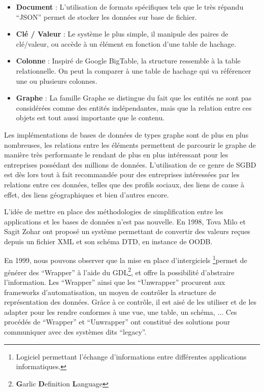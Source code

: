 \documentclass[a4paper,fleqn,12pt,oneside]{report}
\begin{document}
\begin{itemize}
\item \textbf{Document} : L'utilisation de formats spécifiques tels que le très répandu \enquote{JSON} permet de stocker les données sur base de fichier.
\item \textbf{Clé / Valeur }: Le système le plus simple, il manipule des paires de clé/valeur, ou accède à un élément en fonction d'une table de hachage.
\item \textbf{Colonne} : Inspiré de Google BigTable, la structure ressemble à la table relationnelle. On peut la comparer à une table de hachage qui va référencer une ou plusieurs colonnes.
\item \textbf{Graphe} : La famille Graphe se distingue du fait que les entités ne sont pas considérées comme des entités indépendantes, mais que la relation entre ces objets est tout aussi importante que le contenu.
\end{itemize} 

Les implémentations de bases de données de types graphe sont de plus en plus nombreuses, les relations entre les éléments permettent de parcourir le graphe de manière très performante \cite{vicknair2010comparison} le rendant de plus en plus intéressant pour les entreprises possédant des millions de données. L'utilisation de ce genre de SGBD est dès lors tout à fait recommandée pour des entreprises intéressées par les relations entre ces données, telles que des profils sociaux, des liens de cause à effet, des liens géographiques et bien d’autres encore.\cite{infoqSite}\cite{NoSqlDef}\cite{bruchez2016bases}

L'idée de mettre en place des méthodologies de simplification entre les applications et les bases de données n'est pas nouvelle. En 1998, Tova Milo et Sagit Zohar ont proposé un système permettant de convertir des valeurs reçues depuis un fichier XML et son schéma DTD, en instance de OODB\cite{milo1998using}. 

\label{frameworksAnalyse}
En 1999, nous pouvons observer que la mise en place d'intergiciels \footnote{Logiciel permettant l'échange d'informations entre différentes applications informatiques. }permet de générer des \enquote{Wrapper} à l'aide du GDL\footnote{\textbf{G}arlic \textbf{D}efinition \textbf{L}anguage}, et offre la possibilité d'abstraire l'information\cite{niswonger1999transforming}. Les \enquote{Wrapper} ainsi que les \enquote{Unwrapper} procurent aux frameworks d'automatisation, un moyen de contrôler la structure de représentation des données. Grâce à ce contrôle, il est aisé de les utiliser et de les adapter pour les rendre conformes à une vue, une table, un schéma, ... Ces procédés de \enquote{Wrapper} et \enquote{Unwrapper} ont constitué des solutions pour communiquer avec des systèmes dits \enquote{legacy}.
\end{document}
